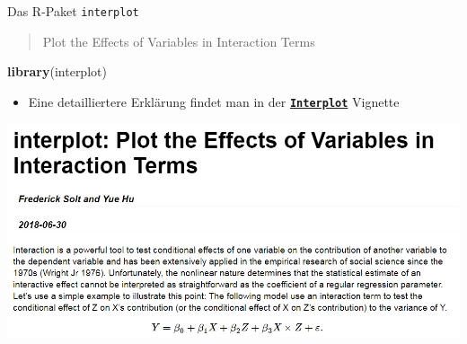 \documentclass[ignorenonframetext,]{beamer}
\newenvironment{Shaded}{\begin{snugshade}}{\end{snugshade}}
\newcommand{\KeywordTok}[1]{\textcolor[rgb]{0.13,0.29,0.53}{\textbf{#1}}}
\newcommand{\NormalTok}[1]{#1}
\providecommand{\tightlist}{%
  \setlength{\itemsep}{0pt}\setlength{\parskip}{0pt}}
\begin{document}
\begin{frame}[fragile]{Das R-Paket \texttt{interplot}}

\begin{quote}
Plot the Effects of Variables in Interaction Terms
\end{quote}

\begin{Shaded}
\begin{Highlighting}[]
\KeywordTok{library}\NormalTok{(interplot)}
\end{Highlighting}
\end{Shaded}

\begin{itemize}
\tightlist
\item
  Eine detailliertere Erklärung findet man in der
  \href{https://cran.r-project.org/web/packages/interplot/vignettes/interplot-vignette.html}{\textbf{\texttt{Interplot}}}
  Vignette
\end{itemize}

\includegraphics{figure/interplot_vignette.PNG}

\end{frame}
\end{document}
